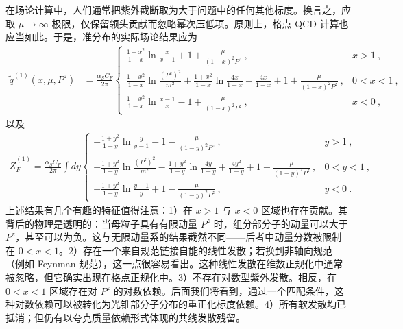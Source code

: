 在场论计算中，人们通常把紫外截断取为大于问题中的任何其他标度。换言之，应取 $\mu\rightarrow \infty$ 极限，仅保留领头贡献而忽略幂次压低项。原则上，格点 QCD 计算也应当如此。于是，准分布的实际场论结果应为
\begin{align}\label{unpolvertex}
\tilde q^{(1)}(x,\mu,P^z)&=\frac{\alpha_S C_F}{2\pi} \left\{ \begin{array} {ll} \frac{1+x^2}{1-x}\ln \frac{x}{x-1}+1+\frac{\mu}{(1-x)^2P^z}\ , & x>1\ , \\ \frac{1+x^2}{1-x}\ln \frac{(P^z)^2}{m^2}+\frac{1+x^2}{1-x}\ln\frac{4x}{1-x}-\frac{4x}{1-x}+1+\frac{\mu}{(1-x)^2P^z}\ , & 0<x<1\ , \\ \frac{1+x^2}{1-x}\ln \frac{x-1}{x}-1+\frac{\mu}{(1-x)^2P^z}\ , & x<0\ , \end{array} \right.
\end{align}
以及
\begin{align}\label{unpolself}
\tilde Z^{(1)}_F
=\frac{\alpha_S C_F}{2\pi} \int dy \left\{ \begin{array} {ll} -\frac{1+y^2}{1-y}\ln \frac{y}{y-1}-1-\frac{\mu}{(1-y)^2P^z}\ , & y>1\ , \\ -\frac{1+y^2}{1-y}\ln \frac{(P^z)^2}{m^2}-\frac{1+y^2}{1-y}\ln\frac{4y}{1-y}+\frac{4y^2}{1-y}+1-\frac{\mu}{(1-y)^2P^z}\ , & 0<y<1\ , \\ -\frac{1+y^2}{1-y}\ln \frac{y-1}{y}+1-\frac{\mu}{(1-y)^2P^z}\ , & y<0\ . \end{array} \right.
\end{align}
上述结果有几个有趣的特征值得注意：1）在 $x>1$ 与 $x<0$ 区域也存在贡献。其背后的物理是透明的：当母粒子具有有限动量 $P^z$ 时，组分部分子的动量可以大于 $P^z$，甚至可以为负。这与无限动量系的结果截然不同——后者中动量分数被限制在 $0<x<1$。2）存在一个来自规范链接自能的线性发散；若换到非轴向规范（例如 Feynman 规范），这一点很容易看出。这种线性发散在维数正规化中通常被忽略，但它确实出现在格点正规化中。3）不存在对数型紫外发散。相反，在 $0<x<1$ 区域存在对 $P^z$ 的对数依赖。后面我们将看到，通过一个匹配条件，这种对数依赖可以被转化为光锥部分子分布的重正化标度依赖。4）所有软发散均已抵消；但仍有以夸克质量依赖形式体现的共线发散残留。

